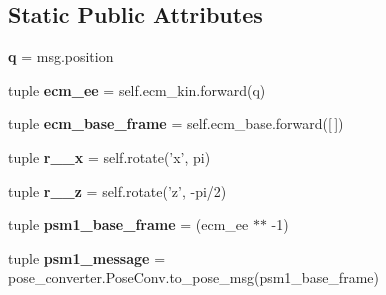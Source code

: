 \subsection*{Static Public Attributes}
\begin{DoxyCompactItemize}
\item 
\hypertarget{classmtm__alignment__test_1_1mtm__aligner_a84768367a1e9952cd2be1f8bf6d77eb5}{{\bfseries q} = msg.\-position}\label{classmtm__alignment__test_1_1mtm__aligner_a84768367a1e9952cd2be1f8bf6d77eb5}

\item 
\hypertarget{classmtm__alignment__test_1_1mtm__aligner_a69769e0c07a10bac224ef50a9fd4070a}{tuple {\bfseries ecm\-\_\-ee} = self.\-ecm\-\_\-kin.\-forward(q)}\label{classmtm__alignment__test_1_1mtm__aligner_a69769e0c07a10bac224ef50a9fd4070a}

\item 
\hypertarget{classmtm__alignment__test_1_1mtm__aligner_a7cb6f99d5700f109f560cd6fa0dbc79f}{tuple {\bfseries ecm\-\_\-base\-\_\-frame} = self.\-ecm\-\_\-base.\-forward(\mbox{[}$\,$\mbox{]})}\label{classmtm__alignment__test_1_1mtm__aligner_a7cb6f99d5700f109f560cd6fa0dbc79f}

\item 
\hypertarget{classmtm__alignment__test_1_1mtm__aligner_ab41240ac9e3960dca058d464b7460874}{tuple {\bfseries r\-\_\-\_\-x} = self.\-rotate('x', pi)}\label{classmtm__alignment__test_1_1mtm__aligner_ab41240ac9e3960dca058d464b7460874}

\item 
\hypertarget{classmtm__alignment__test_1_1mtm__aligner_a1353322b5bb40f0a5d8ef8ae6c644e95}{tuple {\bfseries r\-\_\-\_\-z} = self.\-rotate('z', -\/pi/2)}\label{classmtm__alignment__test_1_1mtm__aligner_a1353322b5bb40f0a5d8ef8ae6c644e95}

\item 
\hypertarget{classmtm__alignment__test_1_1mtm__aligner_af550be8d65ace8a3e291ca55c19cbe41}{tuple {\bfseries psm1\-\_\-base\-\_\-frame} = (ecm\-\_\-ee $\ast$$\ast$ -\/1)}\label{classmtm__alignment__test_1_1mtm__aligner_af550be8d65ace8a3e291ca55c19cbe41}

\item 
\hypertarget{classmtm__alignment__test_1_1mtm__aligner_ab2bda5b0fb885d59bbc8d85226038db2}{tuple {\bfseries psm1\-\_\-message} = pose\-\_\-converter.\-Pose\-Conv.\-to\-\_\-pose\-\_\-msg(psm1\-\_\-base\-\_\-frame)}\label{classmtm__alignment__test_1_1mtm__aligner_ab2bda5b0fb885d59bbc8d85226038db2}


\end{DoxyCompactItemize}
